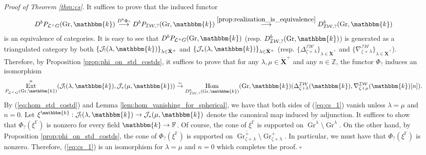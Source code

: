 \documentclass{amsart}
\newcommand{\Z}{\mathbb{Z}}
\newcommand{\F}{\mathbb{F}}
\renewcommand{\L}{\mathcal{L}}
\renewcommand{\k}{\mathbbm{k}}
\newcommand{\scrJ}{\mathcal{J}}
\newcommand{\bfXv}{\check{\mathbf{X}}}
\newcommand{\IW}{\mathcal{IW}}
\DeclareMathOperator{\Hom}{Hom}
\DeclareMathOperator{\Ext}{Ext}
\DeclareMathOperator{\Gr}{Gr}
\theoremstyle{definition}
\newenvironment{midsecproof}[1]{\vspace{\topsep} \noindent \textit{Proof of #1.}}{$\square$ \vspace{\topsep}}
\begin{document}
    \begin{midsecproof}{Theorem \ref{thm:cs}}
        It suffices to prove that the induced functor
        \[D^b P_{\L^+ G} (\Gr, \k) \stackrel{D^b \Phi_?}{\longrightarrow} D^b P_{\IW, ?} (\Gr, \k) \stackrel{\ref{prop:realization_is_equivalence}}{\longrightarrow} D_{\IW, ?}^b (\Gr, \k)  \]
        is an equivalence of categories. It is easy to see that $D^b P_{\L^+ G} (\Gr, \k)$ (resp. $D_{\IW, ?}^b (\Gr, \k)$) is generated as a triangulated category by both $\{\scrJ_! (\lambda, \k)\}_{\lambda \in \bfXv^+}$ and $\{\scrJ_* (\lambda, \k)\}_{\lambda \in \bfXv^+}$ (resp. $\{\Delta_{\zeta + \lambda}^{\IW}\}_{\lambda \in \bfXv^+}$ and $\{\nabla_{\zeta + \lambda}^{\IW}\}_{\lambda \in \bfXv^+}$).
        Therefore, by Proposition \ref{prop:phi_on_std_costds}, it suffices to prove that for any $\lambda, \mu \in \bfXv^+$ and any $n \in \Z$, the functor $\Phi_?$ induces an isomorphism
        \begin{equation}\label{eq:cs_1}
            \Ext_{P_{\L^+ G} (\Gr, \k)}^n (\scrJ_! (\lambda, \k), \scrJ_* (\mu, \k)) \stackrel{\sim}{\to} \Hom_{D_{\IW, ?}^b (\Gr, \k)} (\Gr, \k) (\Delta_{\zeta + \lambda}^{\IW} (\k), \nabla_{\zeta + \mu}^{\IW} (\k) [n]).
        \end{equation}
        By (\ref{eq:hom_std_costd}) and Lemma \ref{lem:hom_vanishing_for_spherical}, we have that both sides of (\ref{eq:cs_1}) vanish unless $\lambda = \mu$ and $n = 0$.
        Let $\xi^{\k} : \scrJ_! (\lambda, \k) \to \scrJ_* (\mu, \k)$ denote the canonical map induced by adjunction. 
        It suffices to show that $\Phi_? (\xi^{\F})$ is nonzero for every field $\k \to \F$. 
        Of course, the cone of $\xi^{\F}$ is supported on $\overline{\Gr^{\lambda}} \setminus \Gr^{\lambda}$.
        On the other hand, by Proposition \ref{prop:phi_on_std_costds}, the cone of $\Phi_? (\xi^{\F})$ is supported on $\overline{\Gr_{\zeta + \lambda}^+} \setminus \Gr_{\zeta + \lambda}^+$.
        In particular, we must have that $\Phi_? (\xi^{\F})$ is nonzero.
        Therefore, (\ref{eq:cs_1}) is an isomorphism for $\lambda = \mu$ and $n = 0$ which completes the proof.
    \end{midsecproof}
\end{document}
